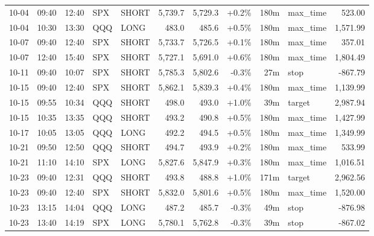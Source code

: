 \documentclass[11pt,a4paper,twoside]{article}
\begin{document}
\begin{center}
\begin{longtable}{>{\color{txtmain}}l l l l l r r r r >{\color{txtmain}}l r}
10-04 & 09:40 & 12:40 & SPX & SHORT & 5,739.7 & 5,729.3 & \textcolor{wingreen}{+0.2\%} & 180m & max\_time & \textcolor{wingreen}{523.00} \\
10-04 & 10:30 & 13:30 & QQQ & LONG & 483.0 & 485.6 & \textcolor{wingreen}{+0.5\%} & 180m & max\_time & \textcolor{wingreen}{1,571.99} \\
10-07 & 09:40 & 12:40 & SPX & SHORT & 5,733.7 & 5,726.5 & \textcolor{wingreen}{+0.1\%} & 180m & max\_time & \textcolor{wingreen}{357.01} \\
10-07 & 12:40 & 15:40 & SPX & SHORT & 5,727.1 & 5,691.0 & \textcolor{wingreen}{+0.6\%} & 180m & max\_time & \textcolor{wingreen}{1,804.49} \\
10-11 & 09:40 & 10:07 & SPX & SHORT & 5,785.3 & 5,802.6 & \textcolor{lossred}{-0.3\%} & 27m & stop & \textcolor{lossred}{-867.79} \\
10-15 & 09:40 & 12:40 & SPX & SHORT & 5,862.1 & 5,839.3 & \textcolor{wingreen}{+0.4\%} & 180m & max\_time & \textcolor{wingreen}{1,139.99} \\
10-15 & 09:55 & 10:34 & QQQ & SHORT & 498.0 & 493.0 & \textcolor{wingreen}{+1.0\%} & 39m & target & \textcolor{wingreen}{2,987.94} \\
10-15 & 10:35 & 13:35 & QQQ & SHORT & 493.2 & 490.8 & \textcolor{wingreen}{+0.5\%} & 180m & max\_time & \textcolor{wingreen}{1,427.99} \\
10-17 & 10:05 & 13:05 & QQQ & LONG & 492.2 & 494.5 & \textcolor{wingreen}{+0.5\%} & 180m & max\_time & \textcolor{wingreen}{1,349.99} \\
10-21 & 09:50 & 12:50 & QQQ & SHORT & 494.7 & 493.9 & \textcolor{wingreen}{+0.2\%} & 180m & max\_time & \textcolor{wingreen}{533.99} \\
10-21 & 11:10 & 14:10 & SPX & LONG & 5,827.6 & 5,847.9 & \textcolor{wingreen}{+0.3\%} & 180m & max\_time & \textcolor{wingreen}{1,016.51} \\
10-23 & 09:40 & 12:31 & QQQ & SHORT & 493.8 & 488.8 & \textcolor{wingreen}{+1.0\%} & 171m & target & \textcolor{wingreen}{2,962.56} \\
10-23 & 09:40 & 12:40 & SPX & SHORT & 5,832.0 & 5,801.6 & \textcolor{wingreen}{+0.5\%} & 180m & max\_time & \textcolor{wingreen}{1,520.00} \\
10-23 & 13:15 & 14:04 & QQQ & LONG & 487.2 & 485.7 & \textcolor{lossred}{-0.3\%} & 49m & stop & \textcolor{lossred}{-876.98} \\
10-23 & 13:40 & 14:19 & SPX & LONG & 5,780.1 & 5,762.8 & \textcolor{lossred}{-0.3\%} & 39m & stop & \textcolor{lossred}{-867.02} \\

\end{longtable}
\end{center}
\end{document}
